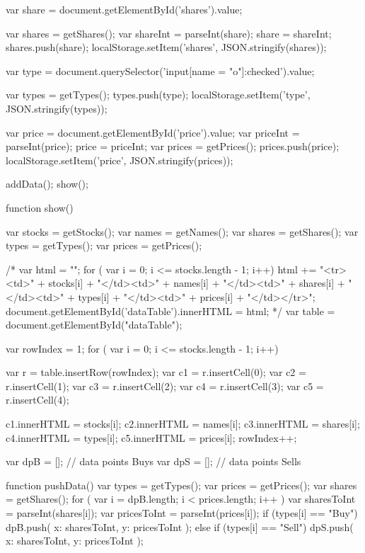 \begin{DoxyVerbInclude}
{  var share = document.getElementById('shares').value;

  var shares = getShares();
  var shareInt = parseInt(share);
  share = shareInt;
  shares.push(share);
  localStorage.setItem('shares', JSON.stringify(shares));

  var type = document.querySelector('input[name = "o"]:checked').value;

  var types = getTypes();
  types.push(type);
  localStorage.setItem('type', JSON.stringify(types));

  var price = document.getElementById('price').value;
  var priceInt = parseInt(price);
  price = priceInt;
  var prices = getPrices();
  prices.push(price);
  localStorage.setItem('price', JSON.stringify(prices));

  addData();
  show();
}

function show() {
  var stocks = getStocks();
  var names = getNames();
  var shares = getShares();
  var types = getTypes();
  var prices = getPrices();

  /*
  var html = "";
  for ( var i = 0; i <= stocks.length - 1; i++) {
    html += "<tr><td>" + stocks[i] + "</td><td>" + names[i] +
        "</td><td>" + shares[i] + "</td><td>" + types[i] +
        "</td><td>" + prices[i] + "</td></tr>";
  }
  document.getElementById('dataTable').innerHTML = html;
  */
  var table = document.getElementById("dataTable");

  var rowIndex = 1;
  for ( var i = 0; i <= stocks.length - 1; i++) {
    var r = table.insertRow(rowIndex);
    var c1 = r.insertCell(0);
    var c2 = r.insertCell(1);
    var c3 = r.insertCell(2);
    var c4 = r.insertCell(3);
    var c5 = r.insertCell(4);

    c1.innerHTML = stocks[i];
    c2.innerHTML = names[i];
    c3.innerHTML = shares[i];
    c4.innerHTML = types[i];
    c5.innerHTML = prices[i];
    rowIndex++;
  }
}

var dpB = []; // data points Buys
var dpS = []; // data points Sells

function pushData() {
  var types = getTypes();
  var prices = getPrices();
  var shares = getShares();
  for ( var i = dpB.length; i < prices.length; i++ ) {
    var sharesToInt = parseInt(shares[i]);
    var pricesToInt = parseInt(prices[i]);
    if (types[i] == "Buy") {
      dpB.push({
        x: sharesToInt,
        y: pricesToInt
      });
    }
    else if (types[i] == "Sell") {
      dpS.push({
        x: sharesToInt,
        y: pricesToInt
      });
    }
  }
}


\end{DoxyVerbInclude}
